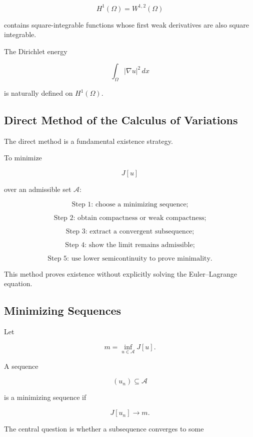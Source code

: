 \[
\boxed{
H^1(\Omega)
=
W^{1,2}(\Omega)
}
\]

contains square-integrable functions whose first weak derivatives are
also square integrable.

The Dirichlet energy

\[
\int_\Omega|\nabla u|^2\,dx
\]

is naturally defined on \(H^1(\Omega)\).

\subsection{Direct Method of the Calculus of Variations}
\label{subsec:direct-method}

The direct method is a fundamental existence strategy.

To minimize

\[
J[u]
\]

over an admissible set \(\mathcal{A}\):

\[
\boxed{
\text{Step 1: choose a minimizing sequence;}
}
\]

\[
\boxed{
\text{Step 2: obtain compactness or weak compactness;}
}
\]

\[
\boxed{
\text{Step 3: extract a convergent subsequence;}
}
\]

\[
\boxed{
\text{Step 4: show the limit remains admissible;}
}
\]

\[
\boxed{
\text{Step 5: use lower semicontinuity to prove minimality.}
}
\]

This method proves existence without explicitly solving the
Euler--Lagrange equation.

\subsection{Minimizing Sequences}
\label{subsec:minimizing-sequences}

Let

\[
m
=
\inf_{u\in\mathcal{A}}J[u].
\]

A sequence

\[
(u_n)\subseteq\mathcal{A}
\]

is a minimizing sequence if

\[
\boxed{
J[u_n]\to m.
}
\]

The central question is whether a subsequence converges to some

